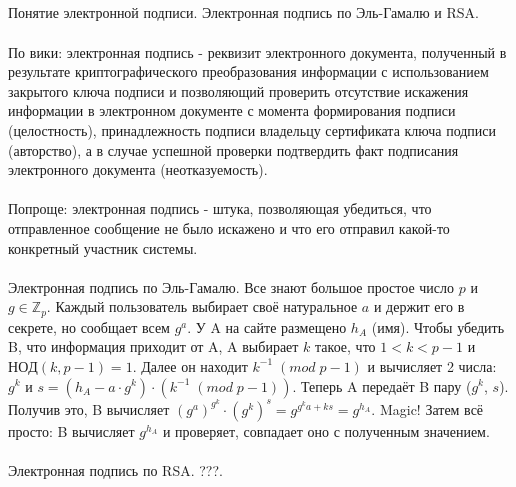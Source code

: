 \documentclass[a4paper,10pt]{article} %
\begin{document}
	\subsection{}
	Понятие электронной подписи. Электронная подпись по Эль-Гамалю и RSA.
	\\\\
	По вики: электронная подпись - реквизит электронного документа, полученный в результате криптографического преобразования информации с использованием закрытого ключа подписи и позволяющий проверить отсутствие искажения информации в электронном документе с момента формирования подписи (целостность), принадлежность подписи владельцу сертификата ключа подписи (авторство), а в случае успешной проверки подтвердить факт подписания электронного документа (неотказуемость).
	\\\\
	Попроще: электронная подпись - штука, позволяющая убедиться, что отправленное сообщение не было искажено и что его отправил какой-то конкретный участник системы.
	\\\\
	Электронная подпись по Эль-Гамалю. Все знают большое простое число $p$ и $g \in \mathbb{Z}_{p}$. Каждый пользователь выбирает своё натуральное $a$ и держит его в секрете, но сообщает всем $g^{a}$. У A на сайте размещено $h_{A}$ (имя). Чтобы убедить B, что информация приходит от A, A выбирает $k$ такое, что $1 < k < p - 1$ и $НОД(k, p - 1) = 1$. Далее он находит $k^{-1} \; (mod \; p - 1)$ и вычисляет 2 числа: $g^{k}$ и $s = (h_{A} - a \cdot g^{k}) \cdot (k^{-1} \; (mod \; p - 1))$. Теперь A передаёт B пару ($g^{k}$, $s$). Получив это, B вычисляет $(g^{a})^{g^{k}} \cdot (g^{k})^{s} = g^{g^{k}a + ks} = g^{h_{A}}$. Magic! Затем всё просто: B вычисляет $g^{h_{A}}$ и проверяет, совпадает оно с полученным значением.
	\\\\
	Электронная подпись по RSA. ???.
\end{document}
